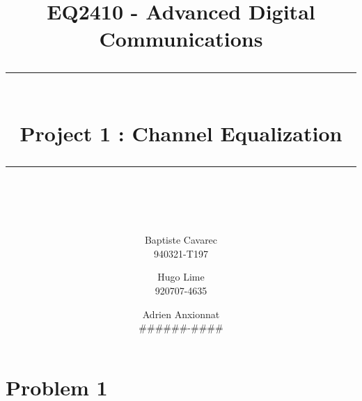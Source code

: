 \documentclass[a4paper]{article}
\begin{document}
\newcommand{\HRule}{\rule{\linewidth}{0.5mm}} 
\title{{\LARGE EQ2410 - Advanced Digital Communications} \\[0.5cm] \HRule \\[0.4cm]{Project 1 : Channel Equalization}\\[0.2cm] \HRule \\[0.5cm] }
\author{Baptiste Cavarec \\ 940321-T197 \and Hugo Lime\\  920707-4635 \and Adrien Anxionnat\\ \#\#\#\#\#\#-\#\#\#\#}

\maketitle



\section{Problem 1}
\end{document}
